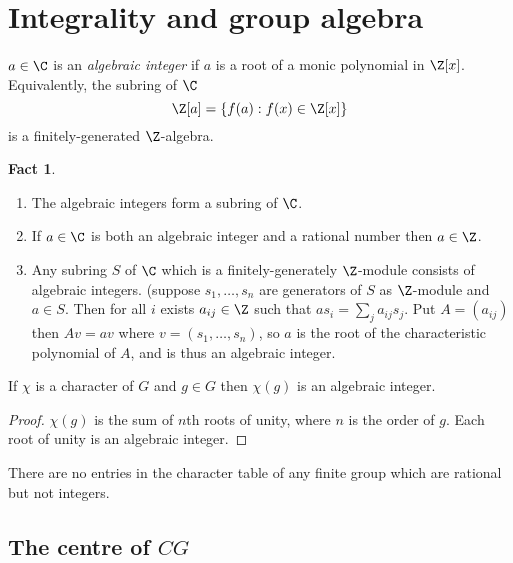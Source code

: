 \documentclass[a4paper]{article}
\theoremstyle{definition}
\newtheorem*{fact}{Fact}
\begin{document}
\section{Integrality and group algebra}

\begin{definition}
  \(a \in \C\) is an \emph{algebraic integer} if \(a\) is a root of a monic polynomial in \(\Z[x]\). Equivalently, the subring of \(\C\)
  \[
    \Z[a] = \{f(a): f(x) \in \Z[x]\}
  \]
  is a finitely-generated \(\Z\)-algebra.
\end{definition}

\begin{fact}\leavevmode
  \begin{enumerate}
  \item The algebraic integers form a subring of \(\C\).
  \item If \(a \in \C\) is both an algebraic integer and a rational number then \(a \in \Z\).
  \item Any subring \(S\) of \(\C\) which is a finitely-generately \(\Z\)-module consists of algebraic integers. (suppose \(s_1, \dots, s_n\) are generators of \(S\) as \(\Z\)-module and \(a \in S\). Then for all \(i\) exists \(a_{ij} \in \Z\) such that \(as_i = \sum_j a_{ij} s_j\). Put \(A = (a_{ij})\) then \(Av = av\) where \(v = (s_1, \dots, s_n)\), so \(a\) is the root of the characteristic polynomial of \(A\), and is thus an algebraic integer.
  \end{enumerate}
\end{fact}

\begin{proposition}
  If \(\chi\) is a character of \(G\) and \(g \in G\) then \(\chi(g)\) is an algebraic integer.
\end{proposition}

\begin{proof}
  \(\chi(g)\) is the sum of \(n\)th roots of unity, where \(n\) is the order of \(g\). Each root of unity is an algebraic integer.
\end{proof}

\begin{corollary}
  There are no entries in the character table of any finite group which are rational but not integers.
\end{corollary}

\subsection{The centre of \(C G\)} %
\end{document}
